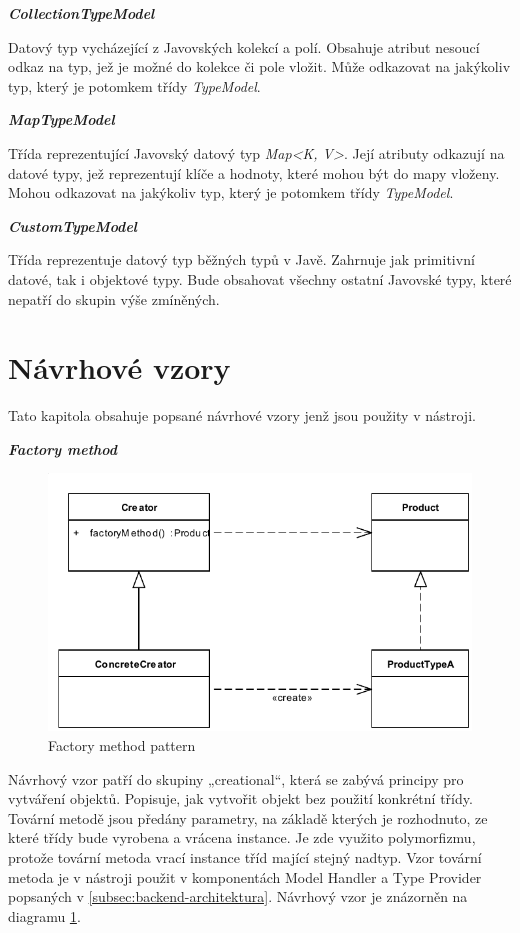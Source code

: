 \documentclass[11pt,twoside,a4paper]{book}
\begin{document}
\textbf{\textit{CollectionTypeModel}}

Datový typ vycházející z Javovských kolekcí a polí. Obsahuje atribut nesoucí odkaz na typ,
jež je možné do kolekce či pole vložit. Může odkazovat na jakýkoliv typ, který je potomkem
třídy {\em TypeModel}.

\textbf{\textit{MapTypeModel}}

Třída reprezentující Javovský datový typ {\em Map<K, V>}. Její atributy odkazují
na datové typy, jež reprezentují klíče a hodnoty, které mohou být do mapy
vloženy. Mohou odkazovat na jakýkoliv typ, který je potomkem třídy {\em
TypeModel}.

\textbf{\textit{CustomTypeModel}}

Třída reprezentuje datový typ běžných typů v Javě. Zahrnuje jak primitivní datové, tak i
objektové typy. Bude obsahovat všechny ostatní Javovské typy, které nepatří do skupin výše
zmíněných.

\section{Návrhové vzory}

Tato kapitola obsahuje popsané návrhové vzory jenž jsou použity v nástroji.

\textbf{\textit{Factory method}}
\begin{figure}[h]
\begin{center}
\includegraphics[width=13cm]{images-pdf/FactoryMethodDesignPattern.pdf}
\caption{Factory method pattern}
\label{fig:factory-pattern}
\end{center}
\end{figure}

Návrhový vzor patří do skupiny „creational“, která se zabývá principy pro 
vytváření objektů. Popisuje, jak vytvořit objekt bez použití konkrétní třídy. 
Tovární metodě jsou předány parametry, na základě kterých je rozhodnuto, ze 
které třídy bude vyrobena a vrácena instance. Je zde využito polymorfizmu, 
protože tovární metoda vrací instance tříd mající stejný nadtyp. Vzor tovární 
metoda je v nástroji použit v komponentách Model Handler a Type Provider 
popsaných v \ref{subsec:backend-architektura}. Návrhový vzor je znázorněn na
diagramu \ref{fig:factory-pattern}.
\end{document}
